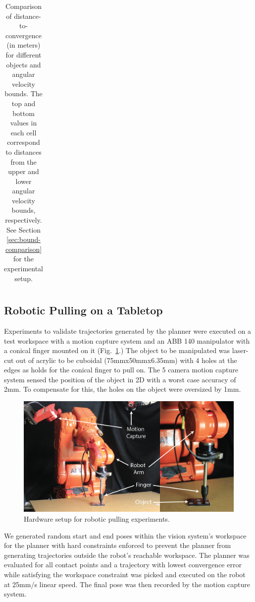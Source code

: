 \documentclass[conference]{IEEEtran}
\begin{document}
\begin{table}[t]
\begin{center}
\begin{tabular}[c]{cccc}
        \bottomrule
      \end{tabular}
  \end{center}
  \caption{Comparison of distance-to-convergence (in meters) for different objects and angular velocity bounds. The top and bottom values in each cell correspond to distances from the upper and lower angular velocity bounds, respectively. See Section \ref{sec:bound-comparison} for the experimental setup.}
  \label{table:convergence-distance}
\end{table}

\subsection{Robotic Pulling on a Tabletop}
Experiments to validate trajectories generated by the planner were executed on a test workspace with a motion capture system and an ABB 140 manipulator with a conical finger mounted on it (Fig.~\ref{fig:hardware}.) The object to be manipulated was laser-cut out of acrylic to be cuboidal (75mmx50mmx6.35mm) with 4 holes at the edges as holds for the conical finger to pull on. The 5 camera motion capture system sensed the position of the object in 2D with a worst case accuracy of 2mm. To compensate for this, the holes on the object were oversized by 1mm.

\begin{figure}
\begin{center}
  \includegraphics[width=\columnwidth]{fig/hardware.png}
\end{center}
\caption{Hardware setup for robotic pulling experiments.}
\label{fig:hardware}
\end{figure}
We generated random start and end poses within the vision system's workspace for the planner with hard constraints enforced to prevent the planner from generating trajectories outside the robot's reachable workspace.  
The planner was evaluated for all contact points and a trajectory with lowest convergence error while satisfying the workspace constraint was picked and executed on the robot at 25mm/s linear speed. The final pose was then recorded by the motion capture system.
\end{document}

